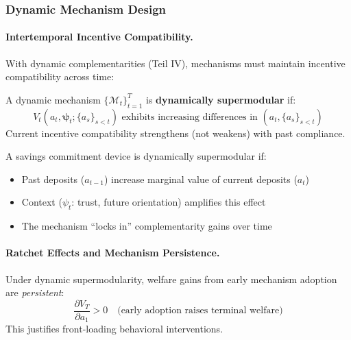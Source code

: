 \subsubsection{Dynamic Mechanism Design}

\paragraph{Intertemporal Incentive Compatibility.}

With dynamic complementarities (Teil IV), mechanisms must maintain incentive 
compatibility across time:

\begin{definition}
\label{def:dynamic-mechanism}
A dynamic mechanism $\{\mathcal{M}_t\}_{t=1}^{T}$ is \textbf{dynamically supermodular} 
if:
\begin{equation}
V_t(a_t, \boldsymbol{\psi}_t; \{a_s\}_{s<t}) \text{ exhibits increasing differences in } 
(a_t, \{a_s\}_{s<t})
\end{equation}
Current incentive compatibility strengthens (not weakens) with past compliance.
\end{definition}

\begin{example}
A savings commitment device is dynamically supermodular if:
\begin{itemize}
    \item Past deposits ($a_{t-1}$) increase marginal value of current deposits ($a_t$)
    \item Context ($\psi_t$: trust, future orientation) amplifies this effect
    \item The mechanism ``locks in'' complementarity gains over time
\end{itemize}
\end{example}

\paragraph{Ratchet Effects and Mechanism Persistence.}

\begin{proposition}
\label{prop:ratchet}
Under dynamic supermodularity, welfare gains from early mechanism adoption are 
\emph{persistent}:
\begin{equation}
\frac{\partial V_T}{\partial a_1} > 0 \quad \text{(early adoption raises terminal welfare)}
\end{equation}
This justifies front-loading behavioral interventions.
\end{proposition}

